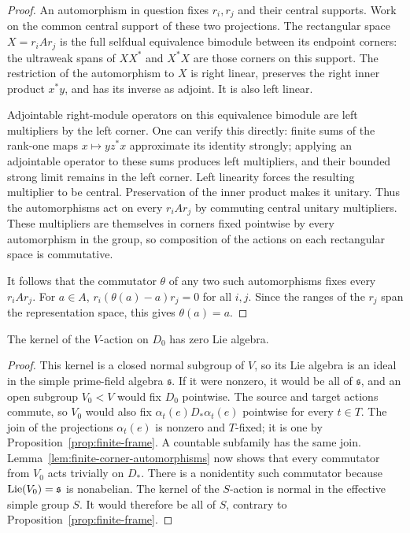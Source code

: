 \begin{proof}
An automorphism in question fixes $r_i,r_j$ and their central
supports.  Work on the common central support of these two
projections.  The rectangular space $X=r_iAr_j$ is the full selfdual
equivalence bimodule between its endpoint corners: the ultraweak
spans of $XX^*$ and $X^*X$ are those corners on this support.
The restriction of the automorphism to $X$ is right linear, preserves
the right inner product $x^*y$, and has its inverse as adjoint.
It is also left linear.

Adjointable right-module operators on this equivalence bimodule are
left multipliers by the left corner.  One can verify this directly:
finite sums of the rank-one maps $x\mapsto yz^*x$ approximate its
identity strongly; applying an adjointable operator to these sums
produces left multipliers, and their bounded strong limit remains in
the left corner.  Left linearity forces the resulting multiplier to
be central.  Preservation of the inner product makes it unitary.
Thus the automorphisms act on every $r_iAr_j$ by commuting central
unitary multipliers.  These multipliers are themselves in corners
fixed pointwise by every automorphism in the group, so composition
of the actions on each rectangular space is commutative.

It follows that the commutator $\theta$ of any two such automorphisms
fixes every $r_iAr_j$.  For $a\in A$,
$r_i(\theta(a)-a)r_j=0$ for all $i,j$.  Since the ranges of the $r_j$
span the representation space, this gives $\theta(a)=a$.
\end{proof}

\begin{lemma}
\label{lem:finite-corner-kernel}
The kernel of the $V$-action on $D_0$ has zero Lie algebra.
\end{lemma}

\begin{proof}
This kernel is a closed normal subgroup of $V$, so its Lie algebra
is an ideal in the simple prime-field algebra $\mathfrak s$.
If it were nonzero, it would be all of $\mathfrak s$, and an open
subgroup $V_0<V$ would fix $D_0$ pointwise.
The source and target actions commute, so $V_0$ would also fix
$\alpha_t(e)D_*\alpha_t(e)$ pointwise for every $t\in T$.
The join of the projections $\alpha_t(e)$ is nonzero and $T$-fixed;
it is one by Proposition~\ref{prop:finite-frame}.  A countable
subfamily has the same join.
Lemma~\ref{lem:finite-corner-automorphisms} now shows that every
commutator from $V_0$ acts trivially on $D_*$.  There is a nonidentity
such commutator because $\operatorname{Lie}(V_0)=\mathfrak s$ is nonabelian.
The kernel of the $S$-action is normal in the effective simple group
$S$.  It would therefore be all of $S$, contrary to
Proposition~\ref{prop:finite-frame}.
\end{proof}

